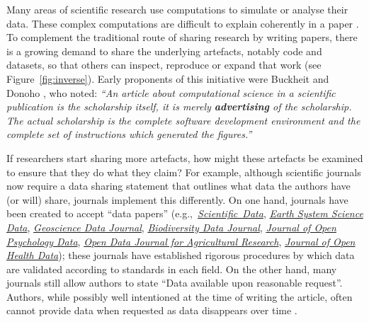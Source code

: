 \documentclass[12pt]{article}
\begin{document}
Many areas of scientific research use computations to simulate or
analyse their data. These complex computations are difficult to
explain coherently in a paper \citep{marwick_how_2015}.  To complement
the traditional route of sharing research by writing papers, there is
a growing demand to share the underlying artefacts, notably code and
datasets, so that others can inspect, reproduce or expand that work
(see Figure~\ref{fig:inverse}).  Early proponents of this initiative
were Buckheit and Donoho
\cite{buckheit_wavelab_1995,claerbout_electronic_1992}, who noted:
\emph{``An article about computational science in a scientific
  publication is  the scholarship itself, it is merely
  \textbf{advertising} of the scholarship. The actual scholarship is
  the complete software development environment and the complete set
  of instructions which generated the figures.''}

If researchers start sharing more artefacts, how might these artefacts
be examined to ensure that they do what they claim?  For example,
although scientific journals now require a data sharing statement that
outlines what data the authors have (or will) share, journals
implement this differently.  On one hand, journals have
been created to accept ``data papers''
(e.g.,~\href{https://www.nature.com/sdata/}{\emph{Scientific~Data}},
\href{https://essd.copernicus.org/}{\emph{Earth System Science Data}},
\href{https://rmets.onlinelibrary.wiley.com/journal/20496060}{\emph{Geoscience
    Data Journal}}, \href{https://bdj.pensoft.net/}{\emph{Biodiversity
    Data Journal}},
\href{https://openpsychologydata.metajnl.com/}{\emph{Journal of Open
    Psychology Data}}, \href{https://odjar.org/}{\emph{Open Data
    Journal for Agricultural Research}},
\href{https://openhealthdata.metajnl.com}{\emph{Journal of Open Health
    Data}}); these journals have established rigorous procedures by
which data are validated according to standards in each field.  On
the other hand, many journals still allow authors to
state ``Data available upon reasonable request''.  Authors, while
possibly well intentioned at the time of writing the article, often
cannot provide data when requested as data disappears over time
\cite{Vines2014-hf}.
\end{document}
